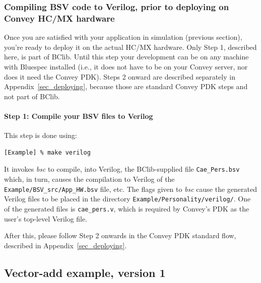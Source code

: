 \documentclass[twoside,letterpaper,11pt]{article}
\newcommand{\hm}{\hspace*{1em}}
\begin{document}

\subsubsection{Compiling BSV code to Verilog, prior to deploying on Convey HC/MX hardware}

\label{sec_gen_verilog}

Once you are satisfied with your application in simulation (previous
section), you're ready to deploy it on the actual HC/MX hardware.  Only
Step 1, described here, is part of BClib.  Until this step your
development can be on any machine with Bluespec installed (i.e., it
does not have to be on your Convey server, nor does it need the Convey
PDK).  Steps 2 onward are described separately in
Appendix~\ref{sec_deploying}, because those are standard Convey PDK
steps and not part of BClib.


\paragraph{Step 1: Compile your BSV files to Verilog}
\hm

This step is done using:
\begin{Verbatim}[frame=single, label=Creating Verilog]
[Example] % make verilog
\end{Verbatim}

It invokes \emph{bsc} to compile, into Verilog, the BClib-supplied
file \verb|Cae_Pers.bsv| which, in turn, causes the compilation to
Verilog of the \verb|Example/BSV_src/App_HW.bsv| file, etc.  The flags given
to \emph{bsc} cause the generated Verilog files to be placed in the
directory \verb|Example/Personality/verilog/|.  One of the generated
files is \verb|cae_pers.v|, which is required by Convey's PDK as the
user's top-level Verilog file.

After this, please follow Step 2 onwards in the Convey PDK standard
flow, described in Appendix~\ref{sec_deploying}.


\subsection{Vector-add example, version 1}

\label{sec_vadd_v1}
\end{document}
